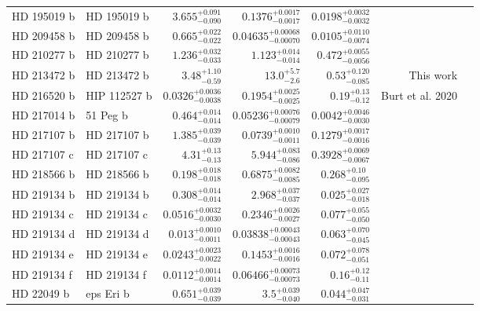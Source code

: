 \begin{longtable*}{llrrrrr}
HD 195019 b & HD 195019 b & $3.655^{+0.091}_{-0.090}$ & $0.1376^{+0.0017}_{-0.0017}$ & $0.0198^{+0.0032}_{-0.0032}$ & \cite{Fischer99} & \\
HD 209458 b & HD 209458 b & $0.665^{+0.022}_{-0.022}$ & $0.04635^{+0.00068}_{-0.00070}$ & $0.0105^{+0.0110}_{-0.0074}$ & \cite{Henry00} & \\
HD 210277 b & HD 210277 b & $1.236^{+0.032}_{-0.033}$ & $1.123^{+0.014}_{-0.014}$ & $0.472^{+0.0055}_{-0.0056}$ & \cite{Marcy99} & \\
HD 213472 b & HD 213472 b & $3.48^{+1.10}_{-0.59}$ & $13.0^{+5.7}_{-2.6}$ & $0.53^{+0.120}_{-0.085}$ & This work & \\
HD 216520 b & HIP 112527 b & $0.0326^{+0.0036}_{-0.0038}$ & $0.1954^{+0.0025}_{-0.0025}$ & $0.19^{+0.13}_{-0.12}$ & Burt et al. 2020 & \\
HD 217014 b & 51 Peg b & $0.464^{+0.014}_{-0.014}$ & $0.05236^{+0.00076}_{-0.00079}$ & $0.0042^{+0.0046}_{-0.0030}$ & \cite{Mayor95} & \\
HD 217107 b & HD 217107 b & $1.385^{+0.039}_{-0.039}$ & $0.0739^{+0.0010}_{-0.0011}$ & $0.1279^{+0.0017}_{-0.0016}$ & \cite{Vogt05} & \\
HD 217107 c & HD 217107 c & $4.31^{+0.13}_{-0.13}$ & $5.944^{+0.083}_{-0.086}$ & $0.3928^{+0.0069}_{-0.0067}$ & \cite{Vogt05} & \\
HD 218566 b & HD 218566 b & $0.198^{+0.018}_{-0.018}$ & $0.6875^{+0.0082}_{-0.0085}$ & $0.268^{+0.10}_{-0.095}$ & \cite{Meschiari11} & \\
HD 219134 b & HD 219134 b & $0.308^{+0.014}_{-0.014}$ & $2.968^{+0.037}_{-0.037}$ & $0.025^{+0.027}_{-0.018}$ & \cite{Vogt15} & \\
HD 219134 c & HD 219134 c & $0.0516^{+0.0032}_{-0.0030}$ & $0.2346^{+0.0026}_{-0.0027}$ & $0.077^{+0.055}_{-0.050}$ & \cite{Vogt15} & \\
HD 219134 d & HD 219134 d & $0.013^{+0.0010}_{-0.0011}$ & $0.03838^{+0.00043}_{-0.00043}$ & $0.063^{+0.070}_{-0.045}$ & \cite{Vogt15} & \\
HD 219134 e & HD 219134 e & $0.0243^{+0.0023}_{-0.0022}$ & $0.1453^{+0.0016}_{-0.0016}$ & $0.072^{+0.078}_{-0.051}$ & \cite{Vogt15} & \\
HD 219134 f & HD 219134 f & $0.0112^{+0.0014}_{-0.0014}$ & $0.06466^{+0.00073}_{-0.00073}$ & $0.16^{+0.12}_{-0.11}$ & \cite{Vogt15} & \\
HD 22049 b & eps Eri b & $0.651^{+0.039}_{-0.039}$ & $3.5^{+0.039}_{-0.040}$ & $0.044^{+0.047}_{-0.031}$ & \cite{Hatzes00} & \\

\end{longtable*}

